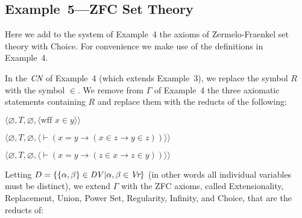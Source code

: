 \subsection{Example~5---ZFC Set Theory}

Here we add to the system of Example~4 the axioms of Zermelo-Fraenkel set
theory with Choice.  For convenience we make use of the
definitions in Example~4.

In the $\mbox{\em CN}$ of Example~4 (which extends Example~3), we replace the symbol $R$
with the symbol $\in$.  We remove from $\Gamma$ of Example~4 the three
axiomatic statements containing $R$ and replace them with the
reducts of the following:
\begin{list}{}{\itemsep 0.0pt}
      \item[] $\langle\varnothing,T,\varnothing,
               \langle \mbox{wff\ }x\in y\rangle\rangle$
      \item[] $\langle\varnothing,T,
               \varnothing,
               \langle \vdash(x=y\to(x\in z\to y\in z))\rangle\rangle$
      \item[] $\langle\varnothing,T,
               \varnothing,
               \langle \vdash(x=y\to(z\in x\to z\in y))\rangle\rangle$
\end{list}
Letting $D=\{\{\alpha,\beta\}\in \mbox{\em DV}\,|\alpha,\beta\in \mbox{\em
Vr}\}$ (in other words all individual variables must be distinct), we extend
$\Gamma$ with the ZFC axioms, called
Extensionality, Replacement, Union, Power
Set, Regularity, Infinity, and Choice, that are the reducts of:
